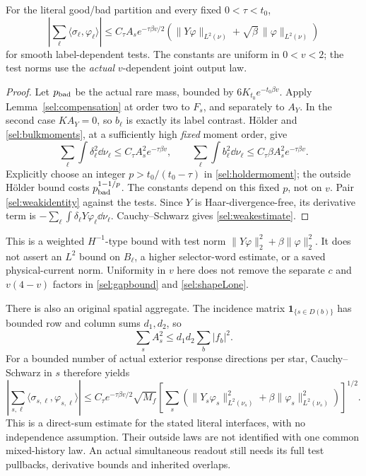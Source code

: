 \begin{proposition}
\label{sel:weakbound}
For the literal good/bad partition and every fixed \(0<\tau<t_0\),
\begin{equation}
 \left|\sum_\ell\langle\sigma_\ell,\varphi_\ell\rangle\right|
 \le C_\tau A_se^{-\tau\beta v/2}
       \left(\|Y\varphi\|_{L^2(\nu)}
                    +\sqrt\beta\,\|\varphi\|_{L^2(\nu)}\right)
 \label{sel:weakestimate}
\end{equation}
for smooth label-dependent tests. The constants are uniform in \(0<v<2\); the test norms use the \emph{actual} \(v\)-dependent joint output law.
\end{proposition}
\begin{proof}
Let \(p_{\rm bad}\) be the actual rare mass, bounded by \(6K_{t_0}e^{-t_0\beta v}\). Apply Lemma~\ref{sel:compensation} at order two to \(F_s\), and separately to \(A_Y\). In the second case \(KA_Y=0\), so \(b_\ell\) is exactly its label contrast. Hölder and \eqref{sel:bulkmoments}, at a sufficiently high \emph{fixed} moment order, give
\[
 \sum_\ell\int\delta_\ell^2\dd\nu_\ell
       \le C_\tau A_s^2e^{-\tau\beta v},\qquad
 \sum_\ell\int b_\ell^2\dd\nu_\ell
       \le C_\tau\beta A_s^2e^{-\tau\beta v}.
\]
Explicitly choose an integer \(p>t_0/(t_0-\tau)\) in \eqref{sel:holdermoment}; the outside Hölder bound costs \(p_{\rm bad}^{1-1/p}\). The constants depend on this fixed \(p\), not on \(v\). Pair \eqref{sel:weakidentity} against the tests. Since \(Y\) is Haar-divergence-free, its derivative term is \(-\sum_\ell\int\delta_\ell Y\varphi_\ell\dd\nu_\ell\). Cauchy--Schwarz gives \eqref{sel:weakestimate}.
\end{proof}

This is a weighted \(H^{-1}\)-type bound with test norm
\(\|Y\varphi\|_2^2+\beta\|\varphi\|_2^2\). It does not assert an \(L^2\) bound on \(B_\ell\), a higher selector-word estimate, or a saved physical-current norm. Uniformity in \(v\) here does not remove the separate \(c\) and \(v(4-v)\) factors in \eqref{sel:gapbound} and \eqref{sel:shapeLone}.

There is also an original spatial aggregate. The incidence matrix \(\mathbf1_{\{s\in D(b)\}}\) has bounded row and column sums \(d_1,d_2\), so
\[
 \sum_sA_s^2\le d_1d_2\sum_b|f_b|^2.
\]
For a bounded number of actual exterior response directions per star, Cauchy--Schwarz in \(s\) therefore yields
\begin{equation}
 \left|\sum_{s,\ell}\langle\sigma_{s,\ell},\varphi_{s,\ell}\rangle\right|
 \le C_\tau e^{-\tau\beta v/2}\sqrt{M_f}
 \left[\sum_s\left(
       \|Y_s\varphi_s\|_{L^2(\nu_s)}^2+
       \beta\|\varphi_s\|_{L^2(\nu_s)}^2\right)\right]^{1/2}.
 \label{sel:directsum}
\end{equation}
This is a direct-sum estimate for the stated literal interfaces, with no independence assumption. Their outside laws are not identified with one common mixed-history law. An actual simultaneous readout still needs its full test pullbacks, derivative bounds and inherited overlaps.

